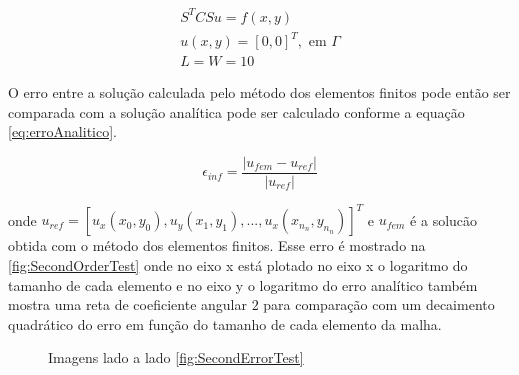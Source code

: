 \begin{equation}\label{eq:irinaproblem}
    \begin{aligned}
        S^T C S u = f(x, y) \\
        u(x,y) = [0, 0]^T, \text{ em } \Gamma \\
        L = W = 10
    \end{aligned}
\end{equation}


O erro entre a solução calculada pelo método dos elementos finitos pode então ser comparada
com a solução analítica pode ser calculado conforme a equação \ref{eq:erroAnalitico}.

\begin{equation} \label{eq:erroAnalitico}
    \epsilon_{inf} =\frac{|u_{fem} - u_{ref}|}{|u_{ref}|}
\end{equation}

onde $u_{ref} = [u_x(x_0, y_0), u_y(x_1, y_1), ..., u_x(x_{n_n}, y_{n_n})]^T$ e $u_{fem}$ é a solucão obtida com o método dos elementos finitos. Esse erro é mostrado na \ref{fig:SecondOrderTest} onde no eixo x 
está plotado no eixo x o logaritmo do tamanho de cada elemento e no eixo y o logaritmo do erro analítico também mostra uma reta de coeficiente angular $2$ para comparação com um decaimento
quadrático do erro em função do tamanho de cada elemento da malha.


\begin{figure}[h]

\center
{}
\qquad
{}
\caption{Imagens lado a lado \ref{fig:SecondErrorTest}}
\end{figure}
    
